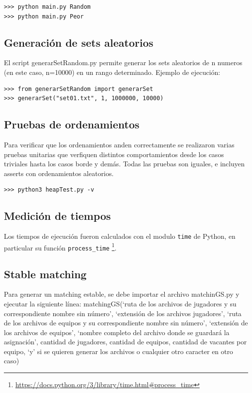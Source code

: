 \documentclass[article,a4paper]{article}
\begin{document}
\begin{verbatim}
>>> python main.py Random
>>> python main.py Peor
\end{verbatim}

\subsection{Generación de sets aleatorios}

El script generarSetRandom.py permite generar los sets aleatorios de n numeros (en este caso, n=10000) en un rango determinado. Ejemplo de ejecución:

\begin{verbatim}
>>> from generarSetRandom import generarSet
>>> generarSet("set01.txt", 1, 1000000, 10000)
\end{verbatim}

\subsection{Pruebas de ordenamientos}
Para verificar que los ordenamientos anden correctamente se realizaron varias pruebas unitarias que verfiquen distintos comportamientos desde los casos triviales hasta los casos borde y demás. Todas las pruebas son iguales, e incluyen asserts con ordenamientos aleatorios.

\begin{verbatim}
>>> python3 heapTest.py -v
\end{verbatim}

\subsection{Medición de tiempos}
 Los tiempos de ejecución fueron calculados con el modulo \texttt{time} de Python, en particular su función \texttt{process\_time} \footnote{\url{https://docs.python.org/3/library/time.html\#process\_time}}.

\subsection{Stable matching}
 Para generar un matching estable, se debe importar el archivo matchinGS.py y ejecutar la siguiente línea:
matchingGS(‘ruta de los archivos  de jugadores y su correspondiente nombre sin número’, ‘extensión de los archivos jugadores’, ‘ruta de los archivos de equipos y su correspondiente nombre sin número’, ‘extensión de los archivos de equipos’, ‘nombre completo del archivo donde se guardará la asignación’, cantidad de jugadores, cantidad de equipos, cantidad de vacantes por equipo, ‘y’ si se quieren generar los archivos o cualquier otro caracter en otro caso)
\end{document}
